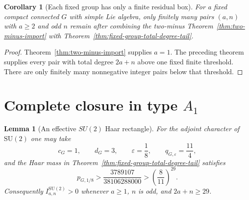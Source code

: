 \documentclass[11pt,reqno]{amsart}
\theoremstyle{plain}
\newtheorem{lemma}[theorem]{Lemma}
\newtheorem{corollary}[theorem]{Corollary}
\theoremstyle{definition}
\begin{document}
\begin{corollary}[Each fixed group has only a finite residual box]
\label{cor:fixed-group-finite-residual}
For a fixed compact connected $G$ with simple Lie algebra, only finitely many
pairs $(a,n)$ with $a\geq2$ and odd $n$ remain after combining the
two-minus Theorem~\ref{thm:two-minus-import} with
Theorem~\ref{thm:fixed-group-total-degree-tail}.
\end{corollary}

\begin{proof}
Theorem~\ref{thm:two-minus-import} supplies $a=1$.  The preceding theorem supplies every
pair with total degree $2a+n$ above one fixed finite threshold.  There are
only finitely many nonnegative integer pairs below that threshold.
\end{proof}

\section{Complete closure in type \texorpdfstring{$A_1$}{A1}}

\begin{lemma}[An effective $SU(2)$ Haar rectangle]
\label{lem:su2-effective-rectangle}
For the adjoint character of $\mathrm{SU}(2)$ one may take
\[
 c_G=1,\qquad d_G=3,\qquad \varepsilon=\frac18,
 \qquad q_{G,\varepsilon}=\frac{11}{4},
\]
and the Haar mass in Theorem~\ref{thm:fixed-group-total-degree-tail}
satisfies
\[
 p_{G,1/8}>
 \frac{3789107}{38106288000}>
 \left(\frac8{11}\right)^{29}.
\]
Consequently $I^{\mathrm{SU}(2)}_{a,n}>0$ whenever $a\geq1$, $n$ is odd,
and $2a+n\geq29$.
\end{lemma}
\end{document}
